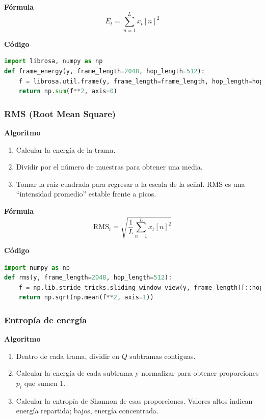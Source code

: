 \textbf{Fórmula}
\[
E_t = \sum_{n=1}^{L} x_t[n]^2
\]

\textbf{Código}
\begin{lstlisting}[language=Python, label={lst:energy_code}, caption={Energía por tramas}]
import librosa, numpy as np
def frame_energy(y, frame_length=2048, hop_length=512):
    f = librosa.util.frame(y, frame_length=frame_length, hop_length=hop_length)
    return np.sum(f**2, axis=0)
\end{lstlisting}

\subsubsection{RMS (Root Mean Square)}
\textbf{Algoritmo} \parencite{oppenheim2010dsp, muller2015fmp}
\begin{enumerate}
    \item Calcular la energía de la trama.
    \item Dividir por el número de muestras para obtener una media.
    \item Tomar la raíz cuadrada para regresar a la escala de la señal. RMS es una “intensidad promedio” estable frente a picos.
\end{enumerate}

\textbf{Fórmula}
\[
\text{RMS}_t=\sqrt{\frac{1}{L}\sum_{n=1}^{L}x_t[n]^2}
\]

\textbf{Código}
\begin{lstlisting}[language=Python, label={lst:rms_code}, caption={RMS por tramas}]
import numpy as np
def rms(y, frame_length=2048, hop_length=512):
    f = np.lib.stride_tricks.sliding_window_view(y, frame_length)[::hop_length]
    return np.sqrt(np.mean(f**2, axis=1))
\end{lstlisting}

\subsubsection{Entropía de energía}
\textbf{Algoritmo} \parencite{peeters2004large, giannakopoulos2014intro}
\begin{enumerate}
    \item Dentro de cada trama, dividir en \(Q\) subtramas contiguas.
    \item Calcular la energía de cada subtrama y normalizar para obtener proporciones \(p_i\) que sumen 1.
    \item Calcular la entropía de Shannon de esas proporciones. Valores altos indican energía repartida; bajos, energía concentrada.
\end{enumerate}

